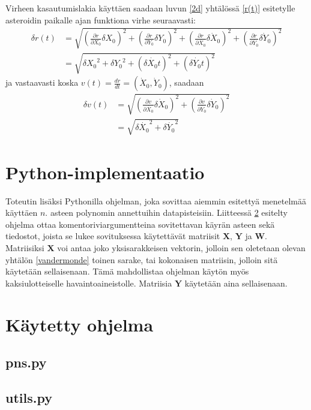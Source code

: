 \documentclass[12pt,a4paper,titlepage]{article}
\newcommand{\matr}[1]{\bm{#1}}
\begin{document}
Virheen kasautumislakia käyttäen saadaan luvun \ref{2d} yhtälössä \ref{r(t)} esitetylle asteroidin paikalle ajan funktiona virhe seuraavasti:
\begin{align}
	\delta r(t) &= \sqrt{\left(\frac{\partial r}{\partial{X_0}} \delta X_0 \right)^2 + \left(\frac{\partial r}{\partial{Y_0}} \delta Y_0 \right)^2 + \left(\frac{\partial r}{\partial\dot{X_0}} \delta \dot X_0 \right)^2 + \left(\frac{\partial r}{\partial\dot{Y_0}} \delta \dot Y_0 \right)^2 } \nonumber\\
	 &= \sqrt{ \delta{X_0}^2 + \delta{Y_0}^2 + \left(\delta\dot{X_0}t\right)^2 + \left(\delta\dot{Y_0}t\right)^2}
\end{align}
ja vastaavasti koska $v(t) = \frac{dr}{dt} = (\dot X_0, \dot Y_0)$, saadaan
\begin{align}
	\delta v(t) &= \sqrt{\left(\frac{\partial v}{\partial\dot{X_0}} \delta \dot X_0 \right)^2 + \left(\frac{\partial v}{\partial\dot{Y_0}} \delta \dot Y_0 \right)^2 } \nonumber\\
	 &= \sqrt{ \delta\dot{X_0}^2 + \delta\dot{Y_0}^2}
\end{align}

\section{Python-implementaatio}
Toteutin lisäksi Pythonilla ohjelman, joka sovittaa aiemmin esitettyä menetelmää käyttäen $n$. asteen polynomin annettuihin datapisteisiin. Liitteessä \ref{koodi} esitelty ohjelma ottaa komentoriviargumentteina sovitettavan käyrän asteen sekä tiedostot, joista se lukee sovituksessa käytettävät matriisit $\matr{X}$, $\matr{Y}$ ja $\matr{W}$. Matriisiksi $\matr{X}$ voi antaa joko yksisarakkeisen vektorin, jolloin sen oletetaan olevan yhtälön \ref{vandermonde} toinen sarake, tai kokonaisen matriisin, jolloin sitä käytetään sellaisenaan. Tämä mahdollistaa ohjelman käytön myös kaksiulotteiselle havaintoaineistolle. Matriisia $\matr{Y}$ käytetään aina sellaisenaan.


\newpage

 
\appendix
\newpage
\section{Käytetty ohjelma} \label{koodi}
\subsection{pns.py} \label{pns}

\newpage
\subsection{utils.py} \label{utils}

\end{document}
